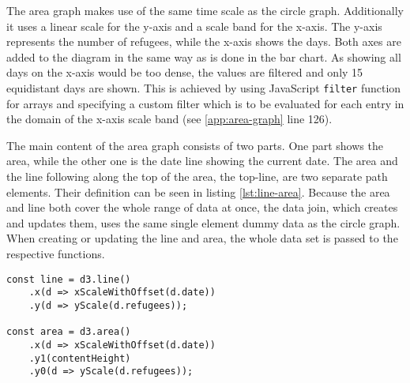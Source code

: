 The area graph makes use of the same time scale as the circle graph. Additionally it uses a linear scale for the y-axis and a scale band for the x-axis. The y-axis represents the number of refugees, while the x-axis shows the days. Both axes are added to the diagram in the same way as is done in the bar chart. As showing all days on the x-axis would be too dense, the values are filtered and only 15 equidistant days are shown. This is achieved by using JavaScript \texttt{filter} function for arrays and specifying a custom filter which is to be evaluated for each entry in the domain of the x-axis scale band (see \ref{app:area-graph} line 126).

The main content of the area graph consists of two parts. One part shows the area, while the other one is the date line showing the current date. The area and the line following along the top of the area, the top-line, are two separate path elements. Their definition can be seen in listing \ref{lst:line-area}. Because the area and line both cover the whole range of data at once, the data join, which creates and updates them, uses the same single element dummy data as the circle graph. When creating or updating the line and area, the whole data set is passed to the respective functions.

\begin{minipage}{0.9\linewidth}
    \begin{lstlisting}[style=htmlCSSjs, captionpos=b, caption={The first constant defines the function for creating the top-line of the area graph. This is achieved by specifying functions for x- and y-values. D3 uses them to calculate the position of each point on the line. Using the arrow functions here applies this for each entry of the data set which is passed as a parameter when calling this function. When the function is called and a data set is provided, by calling \texttt{line(data)}, the line is constructed by calculating the according x- and y-positions for every data point. Defining and creating the area works in similar fashion. Yet there are two y-positions for each x-position. \texttt{y0} is the bottom of the shape, while \texttt{y1} is the top. Switching the definition of \texttt{y0} and \texttt{y1} results in a reversed direction of the SVG path describing the outline of the shape. The \texttt{d3.area()} function allows for a huge variety of shapes. Yet it is not possible to create concave ends on the right or left side of the shape, assuming left and rigth are oriented horizontally. Of course the created shape can be rotated and oriented using all possible SVG tags and attributes. (Section from \ref{app:area-graph} lines 144ff)}, label={lst:line-area}]
const line = d3.line()
    .x(d => xScaleWithOffset(d.date))
    .y(d => yScale(d.refugees));

const area = d3.area()
    .x(d => xScaleWithOffset(d.date))
    .y1(contentHeight)
    .y0(d => yScale(d.refugees));
    \end{lstlisting}
\end{minipage}

